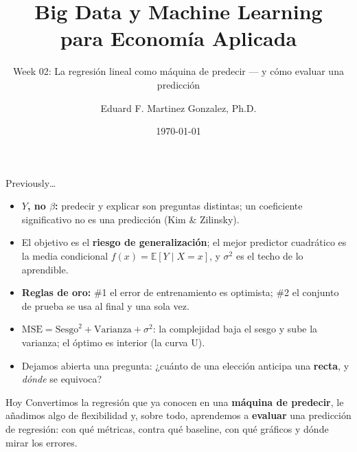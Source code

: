 \documentclass{beamer}
\title[BDML]{Big Data y Machine Learning \\ para Economía Aplicada}
\subtitle{Week 02: La regresión lineal como máquina de predecir --- y cómo evaluar una predicción}
\author{Eduard F. Martinez Gonzalez, Ph.D.}
\institute[]{Departamento de Economía, Universidad Icesi}
\date{\today}
\newcommand{\E}{\mathbb{E}}
\newcommand{\1}{\mathbb{I}}
\newcommand{\MSE}{\mathrm{MSE}}
\begin{document}
\begin{frame}
\titlepage
\end{frame}

\begin{frame}{Previously\ldots}
\small
\begin{itemize}\itemsep5pt
  \item \textbf{$Y$, no $\beta$:} predecir y explicar son preguntas distintas; un coeficiente significativo no es una predicción (Kim \& Zilinsky). \pause
  \item El objetivo es el \textbf{riesgo de generalización}; el mejor predictor cuadrático es la media condicional $f(x) = \E[Y \mid X = x]$, y $\sigma^2$ es el techo de lo aprendible. \pause
  \item \textbf{Reglas de oro:} \#1 el error de entrenamiento es optimista; \#2 el conjunto de prueba se usa al final y una sola vez. \pause
  \item $\MSE = \text{Sesgo}^2 + \text{Varianza} + \sigma^2$: la complejidad baja el sesgo y sube la varianza; el óptimo es interior (la curva U). \pause
  \item Dejamos abierta una pregunta: ¿cuánto de una elección anticipa una \textbf{recta}, y \emph{dónde} se equivoca?
\end{itemize}
\pause
\vspace{0.2cm}
\begin{block}{Hoy}
Convertimos la regresión que ya conocen en una \textbf{máquina de predecir}, le añadimos algo de flexibilidad y, sobre todo, aprendemos a \textbf{evaluar} una predicción de regresión: con qué métricas, contra qué baseline, con qué gráficos y dónde mirar los errores.
\end{block}
\end{frame}
\end{document}
